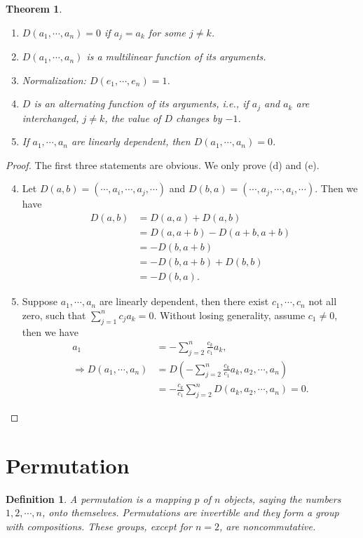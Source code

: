 \documentclass[11pt]{book}
\newtheorem{definition}{Definition}[chapter]
\newtheorem{theorem}{Theorem}[chapter]
\theoremstyle{definition}
\numberwithin{equation}{chapter}
\begin{document}
\begin{theorem}\label{determinant}
~\begin{enumerate}[label=(\alph*)]
    \item $D(a_1,\cdots,a_n) = 0$ if $a_j = a_k$ for some $j\neq k$.
    \item $D(a_1,\cdots,a_n)$ is a multilinear function of its arguments.
    \item Normalization: $D(e_1,\cdots,e_n) = 1$.
    \item $D$ is an alternating function of its arguments, i.e., if $a_j$ and $a_k$ are interchanged, $j\neq k$, the value of $D$ changes by $-1$.
    \item If $a_1,\cdots,a_n$ are linearly dependent, then $D(a_1,\cdots,a_n) = 0$.
\end{enumerate}
\end{theorem}
\begin{proof}
The first three statements are obvious. We only prove (d) and (e).
\begin{enumerate}[label=(\alph*)]
    \setcounter{enumi}{3}
    \item Let $D(a,b) = (\cdots,a_i,\cdots,a_j,\cdots)$ and $D(b,a) = (\cdots,a_j,\cdots,a_i,\cdots)$. Then we have
    \begin{align*}
        D(a,b) & = D(a,a) + D(a,b) \\
        & = D(a,a+b) - D(a+b, a+b) \\
        & = - D(b, a+b) \\
        & = - D(b, a+b) + D(b,b)\\
        & = -D(b,a).
    \end{align*}
    \item Suppose $a_1,\cdots,a_n$ are linearly dependent, then there exist $c_1,\cdots,c_n$ not all zero, such that $\sum^n_{j=1}c_j a_k = 0$. Without losing generality, assume $c_1\neq 0$, then we have
    \begin{align*}
        a_1 & = -\sum^n_{j=2}\frac{c_k}{c_1}a_k, \\
        \Rightarrow D(a_1,\cdots,a_n) & = D\left(-\sum^n_{j=2}\frac{c_k}{c_1}a_k, a_2,\cdots,a_n\right) \\
        & = -\frac{c_k}{c_1} \sum^n_{j=2} D(a_k, a_2, \cdots, a_n) = 0.
    \end{align*}
\end{enumerate}
\end{proof}

\medskip

\section{Permutation}
\begin{definition}
A permutation is a mapping $p$ of $n$ objects, saying the numbers $1,2,\cdots,n$, onto themselves. Permutations are invertible
and they form a group with compositions. These groups, except for $n = 2$, are noncommutative.
\end{definition}
\end{document}
